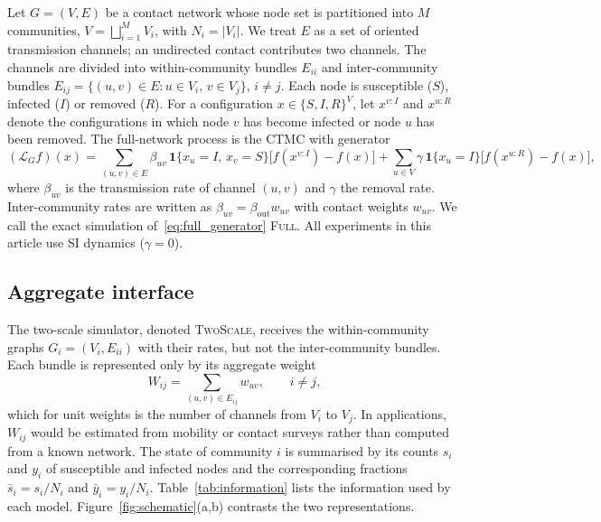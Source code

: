 \documentclass[a4paper,fleqn]{cas-sc}
\newcommand{\ibar}{\bar{y}}
\newcommand{\sbar}{\bar{s}}
\newcommand{\Full}{\textup{\textsc{Full}}}
\newcommand{\TS}{\textup{\textsc{TwoScale}}}
\newcommand{\ind}{\mathbf{1}}
\begin{document}
Let $G=(V,E)$ be a contact network whose node set is partitioned into $M$ communities, $V=\bigsqcup_{i=1}^{M}V_i$, with $N_i=|V_i|$. We treat $E$ as a set of oriented transmission channels; an undirected contact contributes two channels. The channels are divided into within-community bundles $E_{ii}$ and inter-community bundles $E_{ij}=\{(u,v)\in E:u\in V_i,\,v\in V_j\}$, $i\neq j$. Each node is susceptible ($S$), infected ($I$) or removed ($R$). For a configuration $x\in\{S,I,R\}^V$, let $x^{v:I}$ and $x^{u:R}$ denote the configurations in which node $v$ has become infected or node $u$ has been removed. The full-network process is the CTMC with generator
\begin{equation}
\label{eq:full_generator}
(\mathcal{L}_G f)(x)=\sum_{(u,v)\in E}\beta_{uv}\,\ind\{x_u=I,\,x_v=S\}\bigl[f(x^{v:I})-f(x)\bigr]
+\sum_{u\in V}\gamma\,\ind\{x_u=I\}\bigl[f(x^{u:R})-f(x)\bigr],
\end{equation}
where $\beta_{uv}$ is the transmission rate of channel $(u,v)$ and $\gamma$ the removal rate. Inter-community rates are written as $\beta_{uv}=\beta_{\mathrm{out}}w_{uv}$ with contact weights $w_{uv}$. We call the exact simulation of~\eqref{eq:full_generator} \Full{}. All experiments in this article use SI dynamics ($\gamma=0$).

\subsection{Aggregate interface}
\label{sec:interface}

The two-scale simulator, denoted \TS{}, receives the within-community graphs $G_i=(V_i,E_{ii})$ with their rates, but not the inter-community bundles. Each bundle is represented only by its aggregate weight
\begin{equation}
\label{eq:weight}
W_{ij}=\sum_{(u,v)\in E_{ij}}w_{uv},\qquad i\neq j,
\end{equation}
which for unit weights is the number of channels from $V_i$ to $V_j$. In applications, $W_{ij}$ would be estimated from mobility or contact surveys rather than computed from a known network. The state of community $i$ is summarised by its counts $s_i$ and $y_i$ of susceptible and infected nodes and the corresponding fractions $\sbar_i=s_i/N_i$ and $\ibar_i=y_i/N_i$. Table~\ref{tab:information} lists the information used by each model. Figure~\ref{fig:schematic}(a,b) contrasts the two representations.
\end{document}
